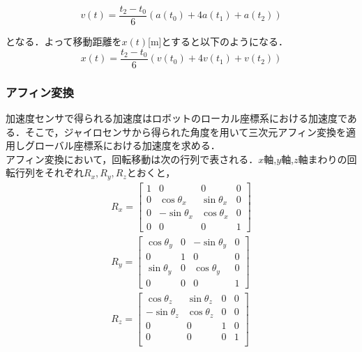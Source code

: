 \documentclass[11pt,a4]{jsarticle}
\begin{document}
\begin{equation}
 v(t)= \frac{t_2-t_0}{6} ( a(t_0)+4a(t_1)+a(t_2) )
\end{equation}

となる．よって移動距離を$x(t)$[m]とすると以下のようになる．
\begin{equation}
 x(t)= \frac{t_2-t_0}{6}(v(t_0)+4v(t_1)+v(t_2))
\end{equation}

 \subsubsection{アフィン変換}
   加速度センサで得られる加速度はロボットのローカル座標系における加速度である．そこで，ジャイロセンサから得られた角度を用いて三次元アフィン変換を適用しグローバル座標系における加速度を求める．\\
   アフィン変換において，回転移動は次の行列で表される．$x$軸,$y$軸,$z$軸まわりの回転行列をそれぞれ$R_x, R_y, R_z$とおくと，
   \begin{eqnarray}
    R_x = \left[
	   \begin{array}{cccc}
	    1 &        0      &       0       & 0 \\
	    0 & \cos \theta_x & \sin \theta_x & 0 \\
	    0 & -\sin \theta_x& \cos \theta_x & 0 \\
	    0 &        0      &       0       & 1
	   \end{array}
	  \right] \\
    R_y = \left[
	   \begin{array}{cccc}
	    \cos \theta_y & 0 & -\sin \theta_y & 0 \\
	          0       & 1 &       0        & 0 \\
	    \sin \theta_y & 0 &  \cos \theta_y & 0 \\
	          0       & 0 &       0        & 1
	   \end{array}
	  \right] \\
    R_z = \left[
	    \begin{array}{cccc}
	     \cos \theta_z & \sin \theta_z & 0 & 0 \\
	    -\sin \theta_z & \cos \theta_z & 0 & 0 \\
		   0	   &	   0	   & 1 & 0 \\
	           0       &       0       & 0 & 1 \\
	    \end{array}
	   \right]
   \end{eqnarray}
\end{document}
